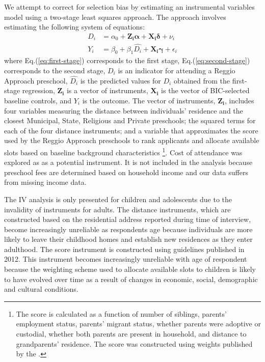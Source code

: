 We attempt to correct for selection bias by estimating an instrumental variables model using a two-stage least squares approach. The approach involves estimating the following system of equations:
\begin{align}
D_i &= \alpha_0 + \bm{Z_i \alpha} + \bm{X_i \delta} + \nu_i \label{eq:first-stage}\\
Y_i &= \beta_0 + \beta_1 \hat{D_i} + \bm{X_i \gamma} + \epsilon_i \label{eq:second-stage}
\end{align}
where Eq.(\ref{eq:first-stage}) corresponds to the first stage, Eq.(\ref{eq:second-stage}) corresponds to the second stage, $D_i$ is an indicator for attending a Reggio Approach preschool, $\hat{D_i}$ is the predicted values for $D_i$ obtained from the first-stage regression, $\bm{Z_i}$ is a vector of instruments, $\bm{X_i}$ is the vector of BIC-selected baseline controls, and $Y_i$ is the outcome. The vector of instruments, $\bm{Z_i}$, includes four variables measuring the distance between individuals' residence and the closest Municipal, State, Religious and Private preschools; the squared terms for each of the four distance instruments; and a variable that approximates the score used by the Reggio Approach preschools to rank applicants and allocate available slots based on baseline background characteristics \footnote{The score is calculated as a function of number of siblings, parents' employment status, parents' migrant status, whether parents were adoptive or custodial, whether both parents are present in household, and distance to grandparents' residence. The score was constructed using weights published by the \citet{Reggio-Emilia_2012_Criteria-admission-2013-14}.}. Cost of attendance was explored as as a potential instrument. It is not included in the analysis because preschool fees are determined based on household income and our data suffers from missing income data.

The IV analysis is only presented for children and adolescents due to the invalidity of instruments for adults. The distance instruments, which are constructed based on the residential address reported during time of interview, become increasingly unreliable as respondents age because individuals are more likely to leave their childhood homes and establish new residences as they enter adulthood. The score instrument is constructed using guidelines published in 2012. This instrument becomes increasingly unreliable with age of respondent because the weighting scheme used to allocate available slots to children is likely to have evolved over time as a result of changes in economic, social, demographic and cultural conditions.

